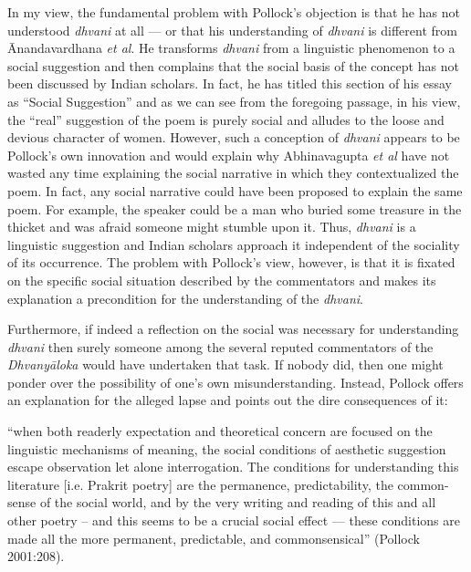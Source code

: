 In my view, the fundamental problem with Pollock's objection is that he has not understood {\sl dhvani} at all --- or that his understanding of {\sl dhvani} is different from Ānandavardhana {\sl et al}. He transforms {\sl dhvani} from a linguistic phenomenon to a social suggestion and then complains that the social basis of the concept has not been discussed by Indian scholars. In fact, he has titled this section of his essay as ``Social Suggestion'' and as we can see from the foregoing passage, in his view, the ``real'' suggestion of the poem is purely social and alludes to the loose and devious character of women. However, such a conception of {\sl dhvani} appears to be Pollock's own innovation and would explain why Abhinavagupta {\sl et al} have not wasted any time explaining the social narrative in which they contextualized the poem. In fact, any social narrative could have been proposed to explain the same poem. For example, the speaker could be a man who buried some treasure in the thicket and was afraid someone might stumble upon it. Thus, {\sl dhvani} is a linguistic suggestion and Indian scholars approach it independent of the sociality of its occurrence. The problem with Pollock's view, however, is that it is fixated on the specific social situation described by the commentators and makes its explanation a precondition for the understanding of the {\sl dhvani}. 

Furthermore, if indeed a reflection on the social was necessary for understanding {\sl dhvani} then surely someone among the several reputed commentators of the {\sl Dhvanyāloka} would have undertaken that task. If nobody did, then one might ponder over the possibility of one's own misunderstanding. Instead, Pollock offers an explanation for the alleged lapse and points out the dire consequences of it: 

\begin{myquote}
``when both readerly expectation and theoretical concern are focused on the linguistic mechanisms of meaning, the social conditions of aesthetic suggestion escape observation let alone interrogation. The conditions for understanding this literature [i.e. Prakrit poetry] are the permanence, predictability, the common-sense of the social world, and by the very writing and reading of this and all other poetry – and this seems to be a crucial social effect --- these conditions are made all the more permanent, predictable, and commonsensical''
\hfill (Pollock 2001:208). 
\end{myquote}

